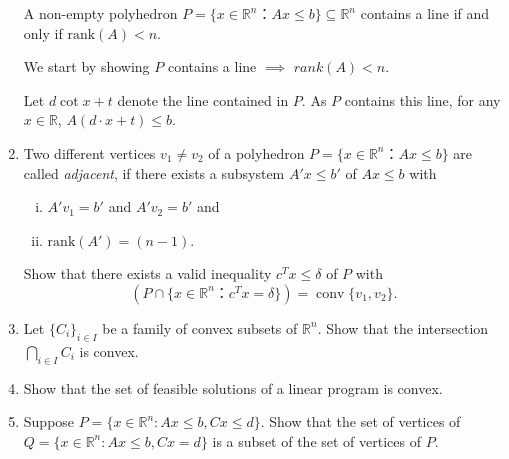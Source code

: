 \documentclass[11pt]{article}
\DeclareMathOperator{\conv}{conv}
\newcommand{\setR}{\mathbb{R}}
\renewcommand{\leq}{\leqslant}
\newcommand{\rank}{\mathrm{rank}}
\begin{document}
\begin{enumerate}[1)]
  A non-empty polyhedron $P = \{ x ∈ ℝ^n ： Ax ≤ b\} ⊆ ℝ^n$ contains a line if  and only if $\rank(A) <n$.
  
  \begin{solution}
  We start by showing $P$ contains a line $\implies$ $rank(A) < n$. 
  
  Let $d \cot x + t$ denote the line contained in $P$. As $P$ contains this line, for any $x \in \setR$, $A(d\cdot x +t) \leq b$. 
  \end{solution}

\item \label{item:11} Two different vertices $v_1 ≠ v_2$ of a polyhedron $P = \{ x ∈ ℝ^n ： Ax≤b\}$ are called \emph{adjacent}, if there exists a subsystem $A'x ≤ b'$ of $Ax≤b$ with
\begin{enumerate}[i)] 
\item $A'v_1 = b'$ and $A'v_2 = b'$  and
\item $\rank(A') = (n-1)$. 
\end{enumerate}

Show that there exists a valid inequality $c^Tx ≤ δ$ of $P$ with
\begin{displaymath}
 \left( P ∩ \{ x ∈ ℝ^n ： c^Tx = δ \} \right) = \conv\{v_1,v_2\}. 
\end{displaymath}
\item Let $\{C_i\}_{i\in I}$ be a family of convex subsets of $\setR^n$.
  Show that the intersection $\bigcap_{i\in I} C_i$ is convex.
\item Show that the set of feasible solutions  of a linear program  is
  convex. \label{conv:item:1}
  
  \item Suppose $P= \{x\in\setR^n : Ax\leq b,Cx\leq d\}$. Show that the set of vertices of
$Q= \{x\in\setR^n : Ax\leq b,Cx= d\}$ is a subset of the set of vertices of $P$.



\end{enumerate}



  
\end{document}
